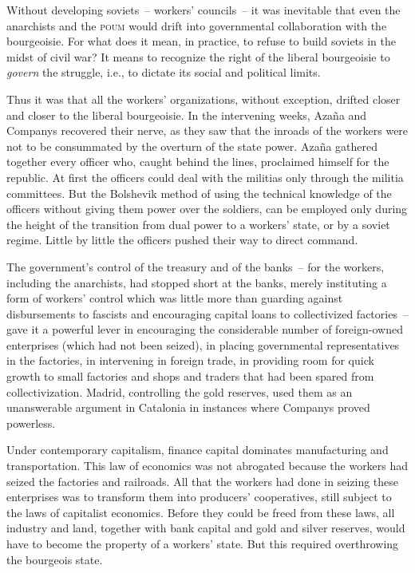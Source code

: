 Without developing soviets~-- workers’ councils~-- it was inevitable that even the anarchists and the \textsc{poum} would drift into governmental collaboration with the bourgeoisie. For what does it mean, in practice, to refuse to build soviets in the midst of civil war? It means to recognize the right of the liberal bourgeoisie to \emph{govern} the struggle, i.e., to dictate its social and political limits.

Thus it was that all the workers’ organizations, without exception, drifted closer and closer to the liberal bourgeoisie. In the intervening weeks, Azaña and Companys recovered their nerve, as they saw that the inroads of the workers were not to be consummated by the overturn of the state power. Azaña gathered together every officer who, caught behind the lines, proclaimed himself for the republic. At first the officers could deal with the militias only through the militia committees. But the Bolshevik method of using the technical knowledge of the officers without giving them power over the soldiers, can be employed only during the height of the transition from dual power to a workers’ state, or by a soviet regime. Little by little the officers pushed their way to direct command.

The government’s control of the treasury and of the banks~-- for the workers, including the anarchists, had stopped short at the banks, merely instituting a form of workers’ control which was little more than guarding against disbursements to fascists and encouraging capital loans to collectivized factories~-- gave it a powerful lever in encouraging the considerable number of foreign-owned enterprises (which had not been seized), in placing governmental representatives in the factories, in intervening in foreign trade, in providing room for quick growth to small factories and shops and traders that had been spared from collectivization. Madrid, controlling the gold reserves, used them as an unanswerable argument in Catalonia in instances where Companys proved powerless.

Under contemporary capitalism, finance capital dominates manufacturing and transportation. This law of economics was not abrogated because the workers had seized the factories and railroads. All that the workers had done in seizing these enterprises was to transform them into producers’ cooperatives, still subject to the laws of capitalist economics. Before they could be freed from these laws, all industry and land, together with bank capital and gold and silver reserves, would have to become the property of a workers’ state. But this required overthrowing the bourgeois state.

